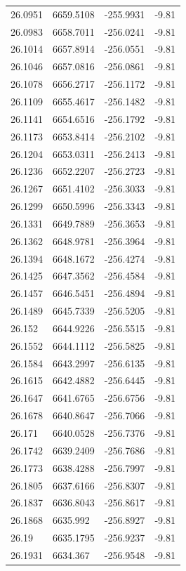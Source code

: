 \begin{table}[H]
\begin{tabular}{llll}
26.0951 & 6659.5108 & -255.9931 & -9.81 \\
26.0983 & 6658.7011 & -256.0241 & -9.81 \\
26.1014 & 6657.8914 & -256.0551 & -9.81 \\
26.1046 & 6657.0816 & -256.0861 & -9.81 \\
26.1078 & 6656.2717 & -256.1172 & -9.81 \\
26.1109 & 6655.4617 & -256.1482 & -9.81 \\
26.1141 & 6654.6516 & -256.1792 & -9.81 \\
26.1173 & 6653.8414 & -256.2102 & -9.81 \\
26.1204 & 6653.0311 & -256.2413 & -9.81 \\
26.1236 & 6652.2207 & -256.2723 & -9.81 \\
26.1267 & 6651.4102 & -256.3033 & -9.81 \\
26.1299 & 6650.5996 & -256.3343 & -9.81 \\
26.1331 & 6649.7889 & -256.3653 & -9.81 \\
26.1362 & 6648.9781 & -256.3964 & -9.81 \\
26.1394 & 6648.1672 & -256.4274 & -9.81 \\
26.1425 & 6647.3562 & -256.4584 & -9.81 \\
26.1457 & 6646.5451 & -256.4894 & -9.81 \\
26.1489 & 6645.7339 & -256.5205 & -9.81 \\
26.152 & 6644.9226 & -256.5515 & -9.81 \\
26.1552 & 6644.1112 & -256.5825 & -9.81 \\
26.1584 & 6643.2997 & -256.6135 & -9.81 \\
26.1615 & 6642.4882 & -256.6445 & -9.81 \\
26.1647 & 6641.6765 & -256.6756 & -9.81 \\
26.1678 & 6640.8647 & -256.7066 & -9.81 \\
26.171 & 6640.0528 & -256.7376 & -9.81 \\
26.1742 & 6639.2409 & -256.7686 & -9.81 \\
26.1773 & 6638.4288 & -256.7997 & -9.81 \\
26.1805 & 6637.6166 & -256.8307 & -9.81 \\
26.1837 & 6636.8043 & -256.8617 & -9.81 \\
26.1868 & 6635.992 & -256.8927 & -9.81 \\
26.19 & 6635.1795 & -256.9237 & -9.81 \\
26.1931 & 6634.367 & -256.9548 & -9.81 \\

\end{tabular}
\end{table}
